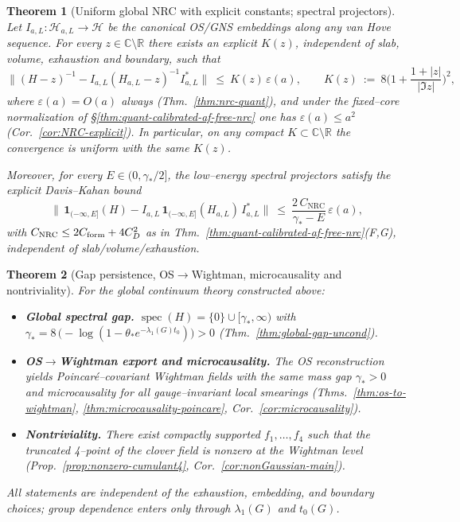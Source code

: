\documentclass[11pt]{amsart}
\theoremstyle{plain}
\newtheorem{theorem}{Theorem}[section]
\theoremstyle{definition}
\theoremstyle{remark}
\begin{document}
\begin{theorem}[Uniform global NRC with explicit constants; spectral projectors]\label{thm:global-nrc-clay}
Let $I_{a,L}:\mathcal H_{a,L}\to\mathcal H$ be the canonical OS/GNS embeddings along any van Hove sequence. For every $z\in\mathbb C\setminus\mathbb R$ there exists an explicit $K(z)$, independent of slab, volume, exhaustion and boundary, such that
\[
  \big\|(H-z)^{-1} - I_{a,L}(H_{a,L}-z)^{-1} I_{a,L}^*\big\|\ \le\ K(z)\,\varepsilon(a),\qquad K(z)\ :=\ 8\Big(1+\frac{1+|z|}{|\Im z|}\Big)^{\!2},
\]
where $\varepsilon(a)=O(a)$ always (Thm.~\ref{thm:nrc-quant}), and under the fixed–core normalization of \S\ref{thm:quant-calibrated-af-free-nrc} one has $\varepsilon(a)\le a^2$ (Cor.~\ref{cor:NRC-explicit}). In particular, on any compact $K\subset\mathbb C\setminus\mathbb R$ the convergence is uniform with the same $K(z)$.

Moreover, for every $E\in(0,\gamma_*/2]$, the low–energy spectral projectors satisfy the explicit Davis–Kahan bound
\[
  \big\|\,\mathbf 1_{(-\infty,E]}(H) - I_{a,L}\,\mathbf 1_{(-\infty,E]}(H_{a,L})\,I_{a,L}^*\big\|\ \le\ \frac{2\,C_{\mathrm{NRC}}}{\gamma_* - E}\,\varepsilon(a),
\]
with $C_{\mathrm{NRC}}\le 2 C_{\rm form}+4 C_D^2$ as in Thm.~\ref{thm:quant-calibrated-af-free-nrc}(F,G), independent of slab/volume/exhaustion.
\end{theorem}

\begin{theorem}[Gap persistence, OS$\to$Wightman, microcausality and nontriviality]\label{thm:gap-wightman-clay}
For the global continuum theory constructed above:
\begin{itemize}
  \item[(a)] \textbf{Global spectral gap.} $\operatorname{spec}(H)=\{0\}\cup[\gamma_*,\infty)$ with $\gamma_*=8\,\big(-\log(1-\theta_* e^{-\lambda_1(G) t_0})\big)>0$ (Thm.~\ref{thm:global-gap-uncond}).
  \item[(b)] \textbf{OS$\to$Wightman export and microcausality.} The OS reconstruction yields Poincar\'e–covariant Wightman fields with the same mass gap $\gamma_*>0$ and microcausality for all gauge–invariant local smearings (Thms.~\ref{thm:os-to-wightman}, \ref{thm:microcausality-poincare}, Cor.~\ref{cor:microcausality}).
  \item[(c)] \textbf{Nontriviality.} There exist compactly supported $f_1,\dots,f_4$ such that the truncated 4–point of the clover field is nonzero at the Wightman level (Prop.~\ref{prop:nonzero-cumulant4}, Cor.~\ref{cor:nonGaussian-main}).
\end{itemize}
All statements are independent of the exhaustion, embedding, and boundary choices; group dependence enters only through $\lambda_1(G)$ and $t_0(G)$.
\end{theorem}
\end{document}
